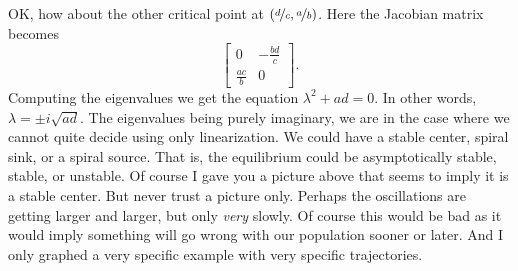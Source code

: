 OK, how about the other critical point at $(\nicefrac{d}{c},\nicefrac{a}{b})$.  Here
the Jacobian matrix becomes
\begin{equation*}
\begin{bmatrix}
0 & -\frac{bd}{c} \\
\frac{ac}{b} & 0
\end{bmatrix} .
\end{equation*}
Computing the eigenvalues we get the equation $\lambda^2 + ad = 0$.  In
other words, $\lambda = \pm i \sqrt{ad}$.  The eigenvalues being
purely imaginary, we are in the case where we cannot quite decide using only
linearization.  We could
have a stable center, spiral sink, or a spiral source.  That is, the
equilibrium could be asymptotically stable, stable, or unstable.  Of
course I gave you a picture above that seems to imply it is a stable
center.  But never trust a picture only.  Perhaps the oscillations
are getting larger and larger, but only \emph{very} slowly.  Of course this would be
bad as it would imply something will go wrong with our population
sooner or later.  And I only graphed a very specific example with very
specific trajectories.

